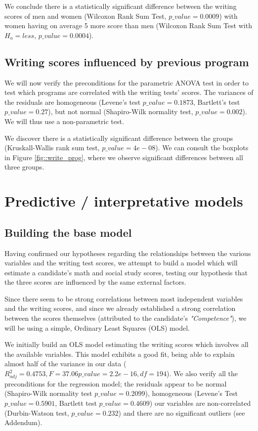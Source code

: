 \documentclass[10pt, a4paper]{article}
\begin{document}
	We conclude there is a statistically significant difference between the writing scores of men and women (Wilcoxon Rank Sum Test, $p\_value = 0.0009$) with women having on average 5 more score than men (Wilcoxon Rank Sum Test with $H_a = less$, $p\_value = 0.0004$).
	
	
	\subsection{Writing scores influenced by previous program}
	We will now verify the preconditions for the parametric ANOVA test in order to test which programs are correlated with the writing tests' scores. The variances of the residuals are homogeneous (Levene's test $p\_value = 0.1873$, Bartlett's test $p\_value = 0.27$), but not normal (Shapiro-Wilk normality test, $p\_value = 0.002$). We will thus use a non-parametric test.
	
	We discover there is a statistically significant difference between the groups (Kruskall-Wallis rank sum test, $p\_value=4e-08$). We can consult the boxplots in Figure \ref{fig::write_prog}, where we observe significant differences between all three groups.
	
	
	\section{Predictive / interpretative models}
	\label{sec::models}
	
	\subsection{Building the base model}
	Having confirmed our hypotheses regarding the relationships between the various variables and the writing test scores, we attempt to build a model which will estimate a candidate's math and social study scores, testing our hypothesis that the three scores are influenced by the same external factors. 
	
	Since there seem to be strong correlations between most independent variables and the writing scores, and since we already established a strong correlation between the scores themselves (attributed to the candidate's \textit{"Competence"}), we will be using a simple, Ordinary Least Squares (OLS) model.
	
	We initially build an OLS model estimating the writing scores which involves all the available variables. This model exhibits a good fit, being able to explain almost half of the variance in our data ($R^2_{adj} = 0.4753, F= 37.06 p\_value=2.2e-16, df=194$). We also verify all the preconditions for the regression model; the residuals appear to be normal (Shapiro-Wilk normality test $p\_value = 0.2099$), homogeneous (Levene's Test $p\_value = 0.5901$, Bartlett test $p\_value = 0.4609$) our variables are non-correlated (Durbin-Watson test, $p\_value=0.232$) and there are no significant outliers (see Addendum).
	
\end{document}
